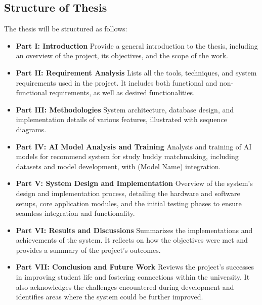 \documentclass[12pt]{article}
\begin{document}
\subsection{Structure of Thesis}
The thesis will be structured as follows:
\begin{itemize}
    \item \textbf{Part I: Introduction }
    \newline
    Provide a general introduction to the thesis, including an overview of the project, its objectives, and the scope of the work.
    \item \textbf{Part II: Requirement Analysis }
    \newline
    Lists all the tools, techniques, and system requirements used in the project. It includes
    both functional and non-functional requirements, as well as desired functionalities.
    \item \textbf{Part III: Methodologies }
    \newline
    System architecture, database design, and implementation details of various features, illustrated with sequence diagrams.
    \item \textbf{Part IV: AI Model Analysis and Training }
    \newline
    Analysis and training of AI models for recommend system for study buddy matchmaking, including datasets and model development, with (Model Name) integration.
    \item \textbf{Part V: System Design and Implementation }
    \newline
    Overview of the system's design and implementation process, detailing the hardware and software setups, core application modules, and the initial testing phases to ensure seamless integration and functionality.
    \item \textbf{Part VI: Results and Discussions }
    \newline 
    Summarizes the implementations and achievements of the system. It reflects on how the
    objectives were met and provides a summary of the project's outcomes.
    \item \textbf{Part VII: Conclusion and Future Work }
    \newline
    Reviews the project's successes in improving student life and fostering connections within the university.
    It also acknowledges the challenges encountered during development and identifies areas where the system could be further improved.
\end{itemize}
\end{document}
